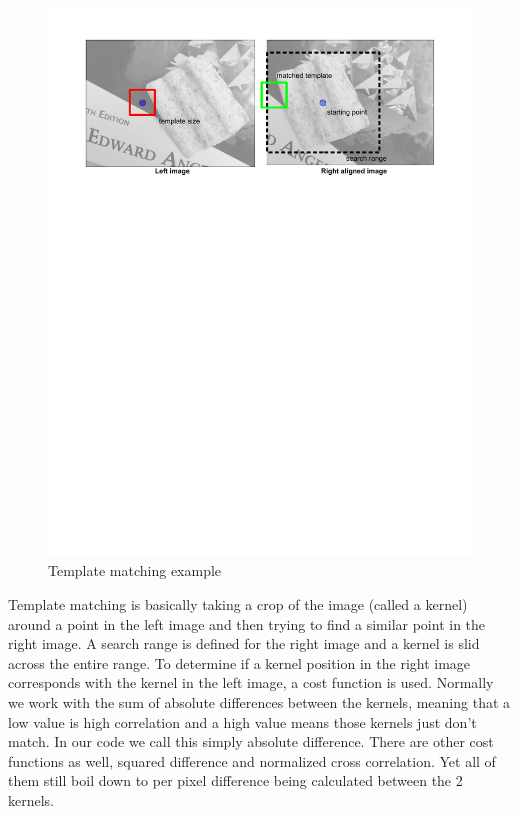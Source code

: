 \begin{figure}[h]
\begin{center}
  \includegraphics[trim = 0in 7.5in 0in 0in, width=7in]{images/stereo/template_matching.pdf}
\end{center}
  \caption{Template matching example}
  \label{fig:template_matching}
\end{figure}

Template matching is basically taking a crop of the image (called a
kernel) around a point in the left image and then trying to find a
similar point in the right image. A search range is defined for the
right image and a kernel is slid across the entire range. To determine
if a kernel position in the right image corresponds with the kernel in
the left image, a cost function is used. Normally we work with the sum
of absolute differences between the kernels, meaning that a low value
is high correlation and a high value means those kernels just don't
match. In our code we call this simply absolute difference. There are
other cost functions as well, squared difference and normalized cross
correlation. Yet all of them still boil down to per pixel difference
being calculated between the 2 kernels.

